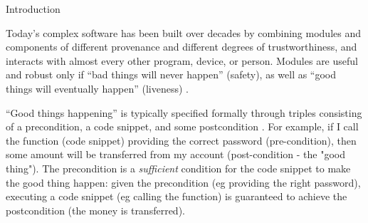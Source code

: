 \newcommand{\sophiaPonder}[2][]{\ponders{Sophia}{blue}{#1} \textcolor{blue}{#2}\xspace}
\renewcommand{\sophia}[2][]

\section{Introduction}

Today's complex software has been built 
over decades by combining modules and components of
different provenance and different degrees of trustworthiness, and 
interacts with almost every other program, device, or person.
Modules are useful and robust only if
``bad things will never happen'' (safety), as well as ``good things
will eventually happen'' (liveness)  \cite{Lamport77}. 
 
 \vspace{.03in}
``Good things happening'' is  typically specified formally 
 through triples consisting of a  precondition, a code snippet, and some
 postcondition \cite{Hoare69}.
 For example, if I call the  function (code snippet) providing the correct 
 password (pre-condition), then some amount will be transferred from my account (post-condition -
 the "good thing").
The precondition is a \emph{sufficient} condition for the code snippet to
make the good thing happen: given the precondition (eg providing the right 
password), executing a
code snippet (eg calling the  function) 
is guaranteed to achieve the postcondition (the money is transferred).

 
 
 

